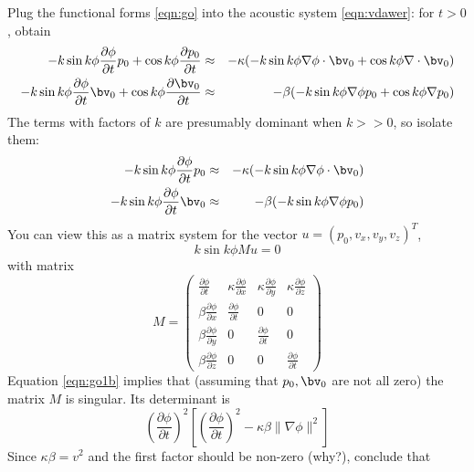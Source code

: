 Plug the functional forms \ref{eqn:go} into the acoustic system \ref{eqn:vdawer}: for $t > 0$, obtain
\begin{eqnarray}
\label{eqn:go1}
-k \sin k\phi \frac{\partial \phi}{\partial t} p_0 + \cos k\phi \frac{\partial p_0}{\partial t}
& \approx & - \kappa (-k \sin k\phi \nabla \phi \cdot \bv_0 + \cos k\phi \nabla\cdot \bv_0)\nonumber \\
-k \sin k\phi \frac{\partial \phi}{\partial t} \bv_0 + \cos k\phi \frac{\partial \bv_0}{\partial t} 
& \approx & - \beta (-k \sin k\phi \nabla \phi p_0 + \cos k\phi \nabla p_0)
\end{eqnarray}
The terms with factors of $k$ are presumably dominant when $k >> 0$, so isolate them:
\begin{eqnarray}
\label{eqn:go1a}
-k \sin k\phi \frac{\partial \phi}{\partial t} p_0 & \approx & - \kappa (-k \sin k\phi \nabla \phi \cdot \bv_0 )\nonumber \\
-k \sin k\phi \frac{\partial \phi}{\partial t} \bv_0 & \approx & - \beta (-k \sin k\phi \nabla \phi p_0)
\end{eqnarray}
You can view this as a matrix system for the vector $u=(p_0,v_x,v_y,v_z)^T$, 
\begin{equation}
\label{eqn:go1b}
k \sin k\phi Mu =0
\end{equation}
with matrix
\begin{equation}
\label{eqn:go1c}
M =\left(\begin{array}{cccc}
 \frac{\partial \phi}{\partial t} & \kappa\frac{\partial \phi}{\partial x} & \kappa\frac{\partial \phi}{\partial y} & \kappa\frac{\partial \phi}{\partial z} \nonumber \\
\beta\frac{\partial \phi}{\partial x} &   \frac{\partial \phi}{\partial t} & 0 & 0\nonumber \\
\beta\frac{\partial \phi}{\partial y} & 0 &  \frac{\partial \phi}{\partial t} & 0 \nonumber \\
\beta\frac{\partial \phi}{\partial z} & 0 & 0 &  \frac{\partial \phi}{\partial t}
\end{array}\right)
\end{equation}
Equation \ref{eqn:go1b} implies that (assuming that $p_0, \bv_0$ are not all zero) the matrix $M$ is singular. Its determinant is
\begin{equation}
\label{eqn:go1d}
\left(\frac{\partial \phi}{\partial t}\right)^2 \left[\left(\frac{\partial \phi}{\partial t}\right)^2 -\kappa \beta \|\nabla \phi\|^2\right]
\end{equation}
Since $\kappa \beta = v^2$ and the first factor should be non-zero (why?), conclude that

